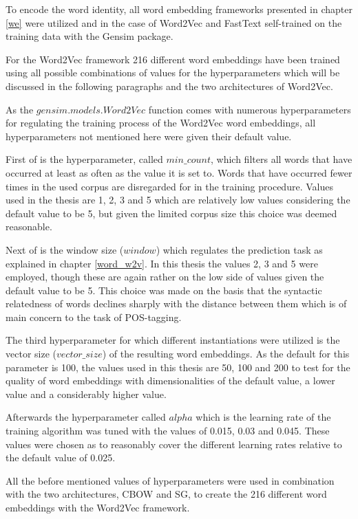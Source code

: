 To encode the word identity, all word embedding frameworks presented in chapter \ref{we} were utilized and in the case of Word2Vec and FastText self-trained on the training data with the Gensim package.

For the Word2Vec framework 216 different word embeddings have been trained using all possible combinations of values for the hyperparameters which will be discussed in the following paragraphs and the two architectures of Word2Vec.

As the $gensim.models.Word2Vec$ function comes with numerous hyperparameters for regulating the training process of the Word2Vec word embeddings, all hyperparameters not mentioned here were given their default value. 

First of is the hyperparameter, called $min\_count$, which filters all words that have occurred at least as often as the value it is set to. Words that have occurred fewer times in the used corpus are disregarded for in the training procedure. Values used in the thesis are 1, 2, 3 and 5 which are relatively low values considering the default value to be 5, but given the limited corpus size this choice was deemed reasonable.

Next of is the window size ($window$) which regulates the prediction task as explained in chapter \ref{word_w2v}. In this thesis the values 2, 3 and 5 were employed, though these are again rather on the low side of values given the default value to be 5. This choice was made on the basis that the syntactic relatedness of words declines sharply with the distance between them which is of main concern to the task of POS-tagging.

The third hyperparameter for which different instantiations were utilized is the vector size ($vector\_size$) of the resulting word embeddings. As the default for this parameter is 100, the values used in this thesis are 50, 100 and 200 to test for the quality of word embeddings with dimensionalities of the default value, a lower value and a considerably higher value.

Afterwards the hyperparameter called $alpha$ which is the learning rate of the training algorithm was tuned with the values of 0.015, 0.03 and 0.045. These values were chosen as to reasonably cover the different learning rates relative to the default value of 0.025.

All the before mentioned values of hyperparameters were used in combination with the two architectures, CBOW and SG, to create the 216 different word embeddings with the Word2Vec framework.


